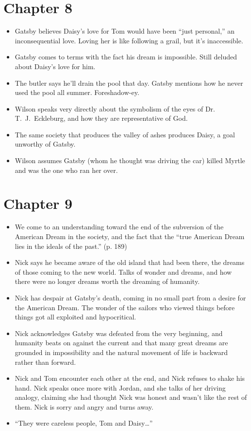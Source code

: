 \documentclass[12pt]{article}
\begin{document}
\section{Chapter 8}
\begin{itemize}
	\item Gatsby believes Daisy's love for Tom would have been ``just 
		personal,'' an inconsequential love.  Loving her is like 
		following a grail, but it's inaccessible.  
	\item Gatsby comes to terms with the fact his dream is impossible.  
		Still deluded about Daisy's love for him.  
	\item The butler says he'll drain the pool that day.  Gatsby mentions 
		how he never used the pool all summer.  Foreshadow-ey.
	\item Wilson speaks very directly about the symbolism of the eyes of 
		Dr. T.~J.~Eckleburg, and how they are representative of God. 
	\item The same society that produces the valley of ashes produces 
		Daisy, a goal unworthy of Gatsby.
	\item Wilson assumes Gatsby (whom he thought was driving the car) 
		killed Myrtle and was the one who ran her over.
\end{itemize}
\section{Chapter 9}
\begin{itemize}
	\item We come to an understanding toward the end of the subversion of 
		the American Dream in the society, and the fact that the 
		``true American Dream lies in the ideals of the past.'' (p. 189)
	\item Nick says he became aware of the old island that had been there, 
		the dreams of those coming to the new world.  Talks of wonder 
		and dreams, and how there were no longer dreams worth the 
		dreaming of humanity.  
	\item Nick has despair at Gatsby's death, coming in no small part from 
		a desire for the American Dream.  The wonder of the sailors 
		who viewed things before things got all exploited and hypocritical.
	\item Nick acknowledges Gatsby was defeated from the very beginning, 
		and humanity beats on against the current and that many great 
		dreams are grounded in impossibility and the natural movement 
		of life is backward rather than forward.
	\item Nick and Tom encounter each other at the end, and Nick refuses 
		to shake his hand.  Nick speaks once more with Jordan, and she 
		talks of her driving analogy, claiming she had thought Nick 
		was honest and wasn't like the rest of them.  Nick is sorry 
		and angry and turns away.  
	\item ``They were careless people, Tom and Daisy\ldots''
\end{itemize}
\end{document}
